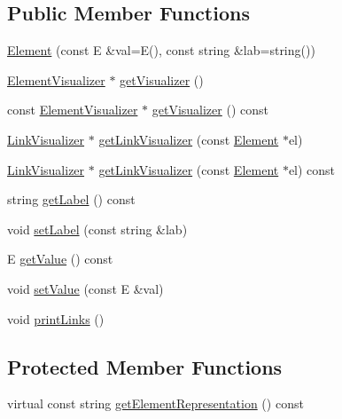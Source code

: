 \subsection*{Public Member Functions}
\begin{DoxyCompactItemize}
\item 
\mbox{\hyperlink{classbridges_1_1_element_abc7131584142ea48faf3b7a8033d1fef}{Element}} (const E \&val=E(), const string \&lab=string())
\item 
\mbox{\hyperlink{classbridges_1_1_element_visualizer}{Element\+Visualizer}} $\ast$ \mbox{\hyperlink{classbridges_1_1_element_a358f350ae6e33d55c4ac9f9213d0c5bc}{get\+Visualizer}} ()
\item 
const \mbox{\hyperlink{classbridges_1_1_element_visualizer}{Element\+Visualizer}} $\ast$ \mbox{\hyperlink{classbridges_1_1_element_a27d023054130e17234ace34ba35e766e}{get\+Visualizer}} () const
\item 
\mbox{\hyperlink{classbridges_1_1_link_visualizer}{Link\+Visualizer}} $\ast$ \mbox{\hyperlink{classbridges_1_1_element_aa8dd91d04c22c697f7c500a18642282f}{get\+Link\+Visualizer}} (const \mbox{\hyperlink{classbridges_1_1_element}{Element}} $\ast$el)
\item 
\mbox{\hyperlink{classbridges_1_1_link_visualizer}{Link\+Visualizer}} $\ast$ \mbox{\hyperlink{classbridges_1_1_element_a202553f482b9a49057c8c87a368cc93a}{get\+Link\+Visualizer}} (const \mbox{\hyperlink{classbridges_1_1_element}{Element}} $\ast$el) const
\item 
string \mbox{\hyperlink{classbridges_1_1_element_a38df6d5f1e0203dfa85b073b6756194e}{get\+Label}} () const
\item 
void \mbox{\hyperlink{classbridges_1_1_element_a22313b74452175d07650168a701daa99}{set\+Label}} (const string \&lab)
\item 
E \mbox{\hyperlink{classbridges_1_1_element_a7df53b8b248020e9536bb951c725c7ba}{get\+Value}} () const
\item 
void \mbox{\hyperlink{classbridges_1_1_element_a737cb19281b6aa45a5a1dc9d592dad93}{set\+Value}} (const E \&val)
\item 
void \mbox{\hyperlink{classbridges_1_1_element_ae6f773c7222ff3a37c402e5e1f413c66}{print\+Links}} ()
\end{DoxyCompactItemize}
\subsection*{Protected Member Functions}
\begin{DoxyCompactItemize}
\item 
virtual const string \mbox{\hyperlink{classbridges_1_1_element_abfea1b7226b774be648e15f6b2c9daba}{get\+Element\+Representation}} () const
\end{DoxyCompactItemize}
